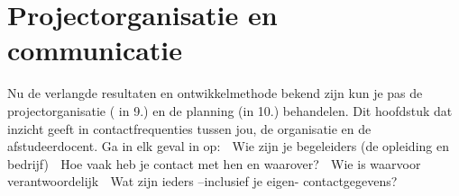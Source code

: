 \chapter{Projectorganisatie en communicatie}
Nu de verlangde resultaten en ontwikkelmethode bekend zijn kun je pas de projectorganisatie ( in 9.) en de planning (in 10.) behandelen. Dit hoofdstuk dat inzicht geeft in contactfrequenties tussen jou, de organisatie en de afstudeerdocent. Ga in elk geval in op:
 Wie zijn je begeleiders (de opleiding en bedrijf)
 Hoe vaak heb je contact met hen en waarover?
 Wie is waarvoor verantwoordelijk
 Wat zijn ieders –inclusief je eigen- contactgegevens?